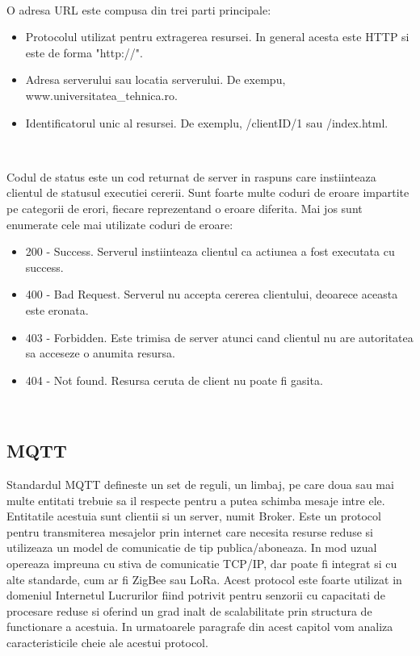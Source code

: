 \

O adresa URL este compusa din trei parti principale:
\begin{itemize}
	\item Protocolul utilizat pentru extragerea resursei. In general acesta este HTTP si este de forma "http://".
	\item Adresa serverului sau locatia serverului. De exempu, www.universitatea\_tehnica.ro.
	\item Identificatorul unic al resursei. De exemplu, /clientID/1 sau /index.html.
\end{itemize}

\

Codul de status este un cod returnat de server in raspuns care instiinteaza clientul de statusul executiei cererii. Sunt foarte multe coduri de eroare 
impartite pe categorii de erori, fiecare reprezentand o eroare diferita. Mai jos sunt enumerate cele mai utilizate coduri de eroare:
\begin{itemize}
	\item 200 - Success. Serverul instiinteaza clientul ca actiunea a fost executata cu success.
	\item 400 - Bad Request. Serverul nu accepta cererea clientului, deoarece aceasta este eronata. 
	\item 403 - Forbidden. Este trimisa de server atunci cand clientul nu are autoritatea sa acceseze o anumita resursa.
	\item 404 - Not found. Resursa ceruta de client nu poate fi gasita. 
\end{itemize}

\

\subsection{MQTT}\label{sec:mqtt}
Standardul MQTT defineste un set de reguli, un limbaj, pe care doua sau mai multe entitati trebuie sa il respecte pentru a putea schimba mesaje intre 
ele. Entitatile acestuia sunt clientii si un server, numit Broker. Este un protocol pentru transmiterea mesajelor prin internet care necesita resurse reduse si 
utilizeaza un model de comunicatie de tip publica/aboneaza. In mod uzual opereaza impreuna cu stiva de comunicatie TCP/IP, dar poate fi integrat si cu alte 
standarde, cum ar fi ZigBee sau LoRa. Acest protocol este foarte utilizat in domeniul Internetul Lucrurilor fiind potrivit pentru 
senzorii cu capacitati de procesare reduse si oferind un grad inalt de scalabilitate prin structura de functionare a acestuia. In urmatoarele paragrafe 
din acest capitol vom analiza caracteristicile cheie ale acestui protocol.

